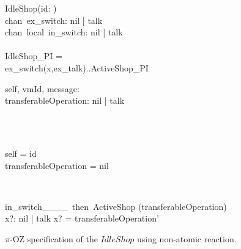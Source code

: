 \begin{figure}[H]
\centering
\begin{class}{IdleShop(id: \integer)}
\ 
\\chan\ ex\_switch: nil | talk
\ 
\\chan\ local\ in\_switch: nil | talk
\ \\ \
\\IdleShop\_PI = 
\\ \qquad  ex\_switch(x,ex\_talk)..ActiveShop\_PI
\\
\begin{state}
self, vmId, message: \integer
\\transferableOperation: nil | talk
\end{state} 
\\
\begin{init}
\\self = id
\\transferableOperation = nil
\end{init} 
\\
\begin{op}{in\_switch\_\_\_\_\ then\ ActiveShop}
\Delta (transferableOperation)
\\x?: nil | talk
\ST
x? = transferableOperation'
\end{op}
\end{class}
\caption{$\pi$-OZ specification of the $IdleShop$ using non-atomic reaction.}
\label{comp_oz_pi_statefull_idleShop_non_atomic}
\end{figure}